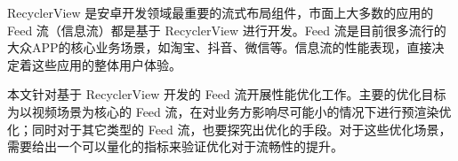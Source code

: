 RecyclerView 是安卓开发领域最重要的流式布局组件，市面上大多数的应用的 Feed 流（信息流）都是基于 RecyclerView 进行开发。Feed 流是目前很多流行的大众APP的核心业务场景，如淘宝、抖音、微信等。信息流的性能表现，直接决定着这些应用的整体用户体验。

本文针对基于 RecyclerView 开发的 Feed 流开展性能优化工作。主要的优化目标为以视频场景为核心的 Feed 流，在对业务方影响尽可能小的情况下进行预渲染优化；同时对于其它类型的 Feed 流，也要探究出优化的手段。对于这些优化场景，需要给出一个可以量化的指标来验证优化对于流畅性的提升。






